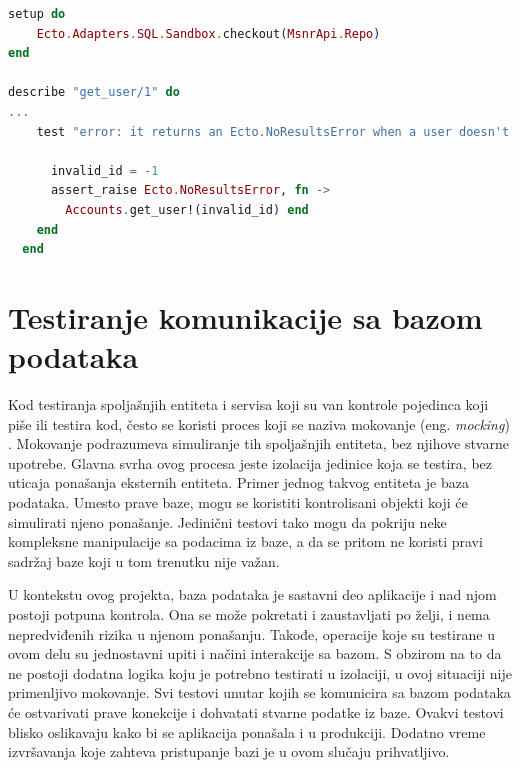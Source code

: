 \documentclass[12pt,oneside]{memoir}
\begin{document}
\begin{lstlisting}[language=elixir, caption={Upotreba makroa \emph{setup} i \emph{assert{\textunderscore}raise} na primeru funkcije \emph{get{\textunderscore}user}},captionpos=b, label={lst:del}]
setup do
    Ecto.Adapters.SQL.Sandbox.checkout(MsnrApi.Repo)
end
  
describe "get_user/1" do
...
    test "error: it returns an Ecto.NoResultsError when a user doesn't exist" do

      invalid_id = -1
      assert_raise Ecto.NoResultsError, fn ->
        Accounts.get_user!(invalid_id) end
    end
  end
\end{lstlisting}


\section{Testiranje komunikacije sa bazom podataka}
\label{sec:baza}

\par Kod testiranja spoljašnjih entiteta i servisa koji su van kontrole pojedinca koji piše ili testira kod, često se koristi proces koji se naziva mokovanje (eng. \emph{mocking}) \cite{external}. Mokovanje podrazumeva simuliranje tih spoljašnjih entiteta, bez njihove stvarne upotrebe. Glavna svrha ovog procesa jeste izolacija jedinice koja se testira, bez uticaja ponašanja eksternih entiteta. Primer jednog takvog entiteta je baza podataka. Umesto prave baze, mogu se koristiti kontrolisani objekti koji će simulirati njeno ponašanje. Jedinični testovi tako mogu da pokriju neke kompleksne manipulacije sa podacima iz baze, a da se pritom ne koristi pravi sadržaj baze koji u tom trenutku nije važan. 
\par U kontekstu ovog projekta, baza podataka je sastavni deo aplikacije i nad njom postoji potpuna kontrola. Ona se može pokretati i zaustavljati po želji, i nema nepredviđenih rizika u njenom ponašanju. Takođe, operacije koje su testirane u ovom delu su jednostavni upiti i načini interakcije sa bazom. S obzirom na to da ne postoji dodatna logika koju je potrebno testirati u izolaciji, u ovoj situaciji nije primenljivo mokovanje. Svi testovi unutar kojih se komunicira sa bazom podataka će ostvarivati prave konekcije i dohvatati stvarne podatke iz baze. Ovakvi testovi blisko oslikavaju kako bi se aplikacija ponašala i u produkciji. Dodatno vreme izvršavanja koje zahteva pristupanje bazi je u ovom slučaju prihvatljivo.
\end{document}
